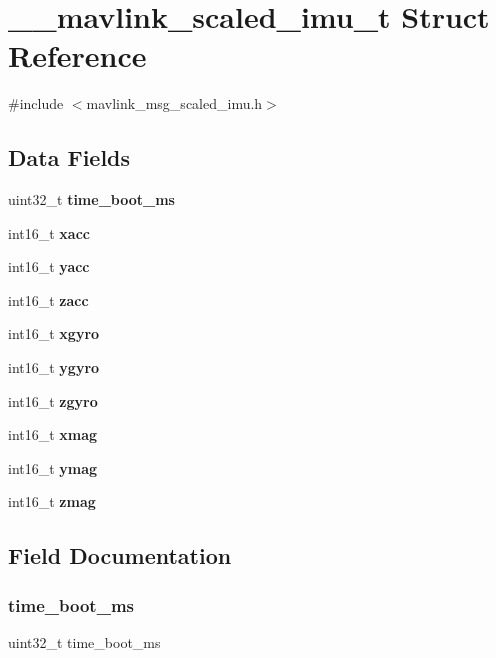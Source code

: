 \section{\+\_\+\+\_\+mavlink\+\_\+scaled\+\_\+imu\+\_\+t Struct Reference}
\label{struct____mavlink__scaled__imu__t}


{\ttfamily \#include $<$mavlink\+\_\+msg\+\_\+scaled\+\_\+imu.\+h$>$}

\subsection*{Data Fields}
\begin{DoxyCompactItemize}
\item 
uint32\+\_\+t \textbf{ time\+\_\+boot\+\_\+ms}
\item 
int16\+\_\+t \textbf{ xacc}
\item 
int16\+\_\+t \textbf{ yacc}
\item 
int16\+\_\+t \textbf{ zacc}
\item 
int16\+\_\+t \textbf{ xgyro}
\item 
int16\+\_\+t \textbf{ ygyro}
\item 
int16\+\_\+t \textbf{ zgyro}
\item 
int16\+\_\+t \textbf{ xmag}
\item 
int16\+\_\+t \textbf{ ymag}
\item 
int16\+\_\+t \textbf{ zmag}
\end{DoxyCompactItemize}


\subsection{Field Documentation}
\mbox{\label{struct____mavlink__scaled__imu__t_ad4e96ee46e36270d1ab66060e46f8c79}} 
\subsubsection{time\+\_\+boot\+\_\+ms}
{\footnotesize\ttfamily uint32\+\_\+t time\+\_\+boot\+\_\+ms}

\mbox{\label{struct____mavlink__scaled__imu__t_a962ef46758affd4dcec9a67cb11ed051}} 
